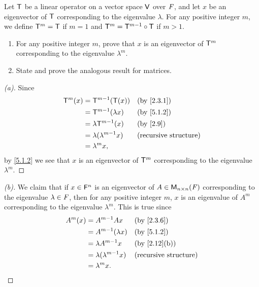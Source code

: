 \begin{ex}\label{ex:5.1.15}
  Let \(\mathsf{T}\) be a linear operator on a vector space \(\mathsf{V}\) over \(\mathit{F}\), and let \(x\) be an eigenvector of \(\mathsf{T}\) corresponding to the eigenvalue \(\lambda\).
  For any positive integer \(m\), we define \(\mathsf{T}^m = \mathsf{T}\) if \(m = 1\) and \(\mathsf{T}^m = \mathsf{T}^{m - 1} \circ \mathsf{T}\) if \(m > 1\).
  \begin{enumerate}
    \item For any positive integer \(m\), prove that \(x\) is an eigenvector of \(\mathsf{T}^m\) corresponding to the eigenvalue \(\lambda^m\).
    \item State and prove the analogous result for matrices.
  \end{enumerate}
\end{ex}

\begin{proof}[(a)]
  Since
  \begin{align*}
    \T^m(x) & = \T^{m - 1}(\T(x))           &  & \text{(by \cref{2.3.1})}     \\
            & = \T^{m - 1}(\lambda x)       &  & \text{(by \cref{5.1.2})}     \\
            & = \lambda \T^{m - 1}(x)       &  & \text{(by \cref{2.9})}       \\
            & = \lambda (\lambda^{m - 1} x) &  & \text{(recursive structure)} \\
            & = \lambda^m x,
  \end{align*}
  by \cref{5.1.2} we see that \(x\) is an eigenvector of \(\mathsf{T}^m\) corresponding to the eigenvalue \(\lambda^m\).
\end{proof}

\begin{proof}[(b)]
  We claim that if \(x \in \mathsf{F}^n\) is an eigenvector of \(A \in \mathsf{M}_{{n} \times n}({\mathit{F}})\) corresponding to the eigenvalue \(\lambda \in \mathit{F}\), then for any positive integer \(m\), \(x\) is an eigenvalue of \(A^m\) corresponding to the eigenvalue \(\lambda^m\).
  This is true since
  \begin{align*}
    A^m (x) & = A^{m - 1} Ax                &  & \text{(by \cref{2.3.6})}     \\
            & = A^{m - 1}(\lambda x)        &  & \text{(by \cref{5.1.2})}     \\
            & = \lambda A^{m - 1} x         &  & \text{(by \cref{2.12}(b))}   \\
            & = \lambda (\lambda^{m - 1} x) &  & \text{(recursive structure)} \\
            & = \lambda^m x.
  \end{align*}
\end{proof}


